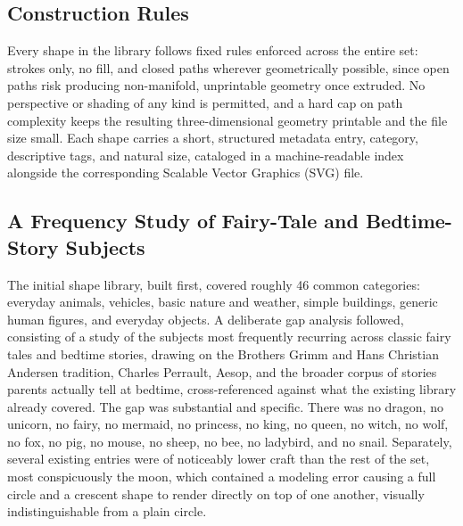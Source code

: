 \documentclass[conference]{IEEEtran}
\begin{document}
\subsection{Construction Rules}

Every shape in the library follows fixed rules enforced across the entire set: strokes only, no fill, and closed paths wherever geometrically possible, since open paths risk producing non-manifold, unprintable geometry once extruded. No perspective or shading of any kind is permitted, and a hard cap on path complexity keeps the resulting three-dimensional geometry printable and the file size small. Each shape carries a short, structured metadata entry, category, descriptive tags, and natural size, cataloged in a machine-readable index alongside the corresponding Scalable Vector Graphics (SVG) file.

\subsection{A Frequency Study of Fairy-Tale and Bedtime-Story Subjects}

The initial shape library, built first, covered roughly 46 common categories: everyday animals, vehicles, basic nature and weather, simple buildings, generic human figures, and everyday objects. A deliberate gap analysis followed, consisting of a study of the subjects most frequently recurring across classic fairy tales and bedtime stories, drawing on the Brothers Grimm and Hans Christian Andersen tradition, Charles Perrault, Aesop, and the broader corpus of stories parents actually tell at bedtime, cross-referenced against what the existing library already covered. The gap was substantial and specific. There was no dragon, no unicorn, no fairy, no mermaid, no princess, no king, no queen, no witch, no wolf, no fox, no pig, no mouse, no sheep, no bee, no ladybird, and no snail. Separately, several existing entries were of noticeably lower craft than the rest of the set, most conspicuously the moon, which contained a modeling error causing a full circle and a crescent shape to render directly on top of one another, visually indistinguishable from a plain circle.
\end{document}

